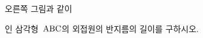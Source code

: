 \noindent\begin{minipage}[t]{0.58\linewidth}\vspace{0pt}\raggedright 오른쪽 그림과 같이 \par\smallskip\end{minipage}\hfill\begin{minipage}[t]{0.4\linewidth}\vspace{0pt}\centering \resizebox{\ifdim\width>\linewidth\linewidth\else\width\fi}{!}{}\end{minipage}\par
\noindent {}\par\smallskip\noindent 인 삼각형~$\mathrm{ABC}$의 외접원의 반지름의 길이를 구하시오.

